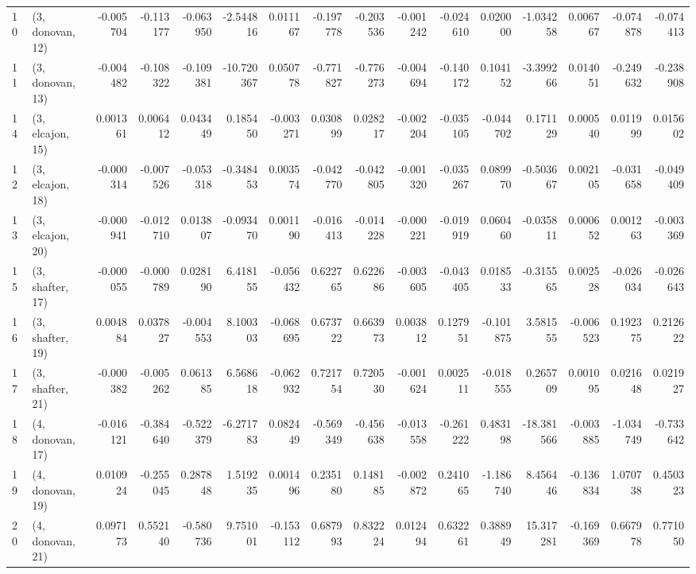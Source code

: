 \begin{tabular}{llrrrrrrrrrrrrrr}
10 &  (3, donovan, 12) &  -0.005704 & -0.113177 & -0.063950 &  -2.544816 &  0.011167 &  -0.197778 & -0.203536 & -0.001242 & -0.024610 &  0.020000 &  -1.034258 &  0.006767 & -0.074878 & -0.074413 \\
11 &  (3, donovan, 13) &  -0.004482 & -0.108322 & -0.109381 & -10.720367 &  0.050778 &  -0.771827 & -0.776273 & -0.004694 & -0.140172 &  0.104152 &  -3.399266 &  0.014051 & -0.249632 & -0.238908 \\
14 &  (3, elcajon, 15) &   0.001361 &  0.006412 &  0.043449 &   0.185450 & -0.003271 &   0.030899 &  0.028217 & -0.002204 & -0.035105 & -0.044702 &   0.171129 &  0.000540 &  0.011999 &  0.015602 \\
12 &  (3, elcajon, 18) &  -0.000314 & -0.007526 & -0.053318 &  -0.348453 &  0.003574 &  -0.042770 & -0.042805 & -0.001320 & -0.035267 &  0.089970 &  -0.503667 &  0.002105 & -0.031658 & -0.049409 \\
13 &  (3, elcajon, 20) &  -0.000941 & -0.012710 &  0.013807 &  -0.093470 &  0.001190 &  -0.016413 & -0.014228 & -0.000221 & -0.019919 &  0.060460 &  -0.035811 &  0.000652 &  0.001263 & -0.003369 \\
15 &  (3, shafter, 17) &  -0.000055 & -0.000789 &  0.028190 &   6.418155 & -0.056432 &   0.622765 &  0.622686 & -0.003605 & -0.043405 &  0.018533 &  -0.315565 &  0.002528 & -0.026034 & -0.026643 \\
16 &  (3, shafter, 19) &   0.004884 &  0.037827 & -0.004553 &   8.100303 & -0.068695 &   0.673722 &  0.663973 &  0.003812 &  0.127951 & -0.101875 &   3.581555 & -0.006523 &  0.192375 &  0.212622 \\
17 &  (3, shafter, 21) &  -0.000382 & -0.005262 &  0.061385 &   6.568618 & -0.062932 &   0.721754 &  0.720530 & -0.001624 &  0.002511 & -0.018555 &   0.265709 &  0.001095 &  0.021648 &  0.021927 \\
18 &  (4, donovan, 17) &  -0.016121 & -0.384640 & -0.522379 &  -6.271783 &  0.082449 &  -0.569349 & -0.456638 & -0.013558 & -0.261222 &  0.483198 & -18.381566 & -0.003885 & -1.034749 & -0.733642 \\
19 &  (4, donovan, 19) &   0.010924 & -0.255045 &  0.287848 &   1.519235 &  0.001496 &   0.235180 &  0.148185 & -0.002872 &  0.241065 & -1.186740 &   8.456446 & -0.136834 &  1.070738 &  0.450323 \\
20 &  (4, donovan, 21) &   0.097173 &  0.552140 & -0.580736 &   9.751001 & -0.153112 &   0.687993 &  0.832224 &  0.012494 &  0.632261 &  0.388949 &  15.317281 & -0.169369 &  0.667978 &  0.771050 \\

\end{tabular}
